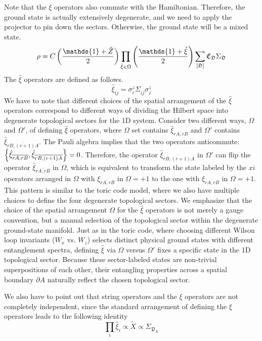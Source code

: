 Note that the $\xi$ operators also commute with the Hamiltonian. Therefore, the ground state is actually extensively degenerate, and we need to apply the projector to pin down the sectors. Otherwise, the ground state will be a mixed state.
\[
    \rho
    =
    C
    \lr{\frac{\mathds{1} + \tilde{Z}}{2}}
    \prod_{\hat{\xi}\in\Omega}
    \lr{\frac{\mathds{1} + \hat{\xi}}{2}}
    \sum_{[\mathfrak{D}]}
    \mathfrak{C}_\mathfrak{D}
    \Sigma_\mathfrak{D}
\]
The $\hat{\xi}$ operators are defined as follows.
\[
\hat{\xi}_{ij} = \sigma^z_i\Sigma_{\overline{ij}}\sigma^z_j
\]
We have to note that different choices of the spatial arrangement of the $\hat{\xi}$ operators correspond to different ways of dividing the Hilbert space into degenerate topological sectors for the 1D system. Consider two different ways, $\Omega$ and $\Omega'$, of defining $\hat{\xi}$ operators, where $\Omega$ set contains $\hat{\xi}_{\overline{rA,rB}}$ and $\Omega'$ contains $\hat{\xi}_{\overline{rB,(r+1)A}}$. The Pauli algebra implies that the two operators anticommute: $\left\{ \hat{\xi}_{\overline{rA,rB}}, \hat{\xi}_{\overline{rB,(r+1)A}} \right\} = 0$. Therefore, the operator $\hat{\xi}_{\overline{rB,(r+1)A}}$ in $\Omega'$ can flip the operator $\hat{\xi}_{\overline{rA,rB}}$ in $\Omega$, which is equivalent to transform the state labeled by the $xi$ operators arranged in $\Omega$ with $\xi_{\overline{rA,rB}}$ in $\Omega = +1$ to the one with $\xi_{\overline{rA,rB}}$ in $\Omega = +1$. This pattern is similar to the toric code model, where we also have multiple choices to define the four degenerate topological sectors. We emphasize that the choice of the spatial arrangement $\Omega$ for the $\hat{\xi}$ operators is not merely a gauge convention, but a manual selection of the topological sector within the degenerate ground-state manifold. Just as in the toric code, where choosing different Wilson loop invariants ($W_x$ vs. $W_z$) selects distinct physical ground states with different entanglement spectra, defining $\hat{\xi}$ via $\Omega$ versus $\Omega'$ fixes a specific state in the 1D topological sector. Because these sector-labeled states are non-trivial superpositions of each other, their entangling properties across a spatial boundary $\partial A$ naturally reflect the chosen topological sector.

We also have to point out that string operators and the $\xi$ operators are not completely independent, since the standard arrangement of defining the $\xi$ operators leads to the following identity
\begin{equation}
    \prod_{i}\hat{\xi}_i \propto \tilde{X} 
    \propto 
    \Sigma_{\mathfrak{D}_{\tilde{X}}}
\end{equation}


